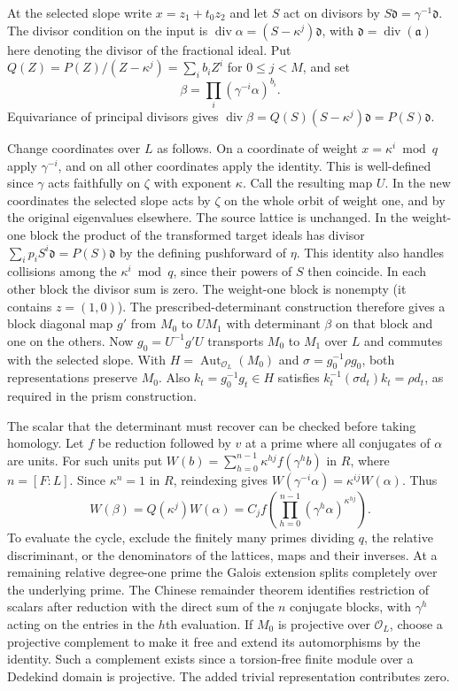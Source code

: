 \documentclass[11pt]{amsart}
\theoremstyle{definition}
\theoremstyle{remark}
\begin{document}
At the selected slope write $x=z_1+t_0z_2$ and let $S$ act on
divisors by $S\mathfrak d=\gamma^{-1}\mathfrak d$. The divisor
condition on the input is
$\operatorname{div}\alpha=(S-\kappa^j)\mathfrak d$, with
$\mathfrak d=\operatorname{div}(\mathfrak a)$ here denoting the
divisor of the fractional ideal. Put
$Q(Z)=P(Z)/(Z-\kappa^j)=\sum_i b_i Z^i$ for $0\le j<M$, and set
\[
 \beta=\prod_i(\gamma^{-i}\alpha)^{b_i}.
\]
Equivariance of principal divisors gives
$\operatorname{div}\beta=Q(S)(S-\kappa^j)\mathfrak d
=P(S)\mathfrak d$.

Change coordinates over $L$ as follows. On a coordinate of weight
$x=\kappa^i\bmod q$ apply $\gamma^{-i}$, and on all other coordinates
apply the identity. This is well-defined since $\gamma$ acts faithfully
on $\zeta$ with exponent $\kappa$. Call the resulting map $U$.
In the new coordinates the selected slope acts by $\zeta$ on the whole
orbit of weight one, and by the original eigenvalues elsewhere.
The source lattice is unchanged. In the weight-one block the product
of the transformed target ideals has divisor
$\sum_i p_i S^i\mathfrak d=P(S)\mathfrak d$ by the defining pushforward
of $\eta$. This identity also handles collisions among the
$\kappa^i\bmod q$, since their powers of $S$ then coincide. In each
other block the divisor sum is zero. The weight-one block is nonempty
(it contains $z=(1,0)$). The prescribed-determinant construction
therefore gives a block diagonal map $g'$ from $M_0$ to $UM_1$
with determinant $\beta$ on that block and one on the others.
Now $g_0=U^{-1}g'U$ transports $M_0$ to $M_1$ over $L$ and commutes
with the selected slope. With $H=\operatorname{Aut}_{\mathcal O_L}(M_0)$
and $\sigma=g_0^{-1}\rho g_0$, both representations preserve $M_0$.
Also $k_t=g_0^{-1}g_t\in H$ satisfies
$k_t^{-1}(\sigma d_t)k_t=\rho d_t$, as required in the prism construction.

The scalar that the determinant must recover can be checked before
taking homology. Let $f$ be reduction followed by $v$ at a prime
where all conjugates of $\alpha$ are units. For such units put
$W(b)=\sum_{h=0}^{n-1}\kappa^{hj} f(\gamma^h b)$ in $R$, where
$n=[F:L]$. Since $\kappa^n=1$ in $R$, reindexing gives
$W(\gamma^{-i}\alpha)=\kappa^{ij}W(\alpha)$. Thus
\[
 W(\beta)=Q(\kappa^j)W(\alpha)
 =C_j f\left(\prod_{h=0}^{n-1}
                (\gamma^h\alpha)^{\kappa^{hj}}\right).
\]
To evaluate the cycle, exclude the finitely many primes dividing
$q$, the relative discriminant, or the denominators of the lattices,
maps and their inverses. At a remaining relative degree-one prime
the Galois extension splits completely over the underlying prime.
The Chinese remainder theorem identifies restriction of scalars
after reduction with the direct sum of the $n$ conjugate blocks,
with $\gamma^h$ acting on the entries in the $h$th evaluation.
If $M_0$ is projective over $\mathcal O_L$, choose a projective
complement to make it free and extend its automorphisms by the
identity. Such a complement exists since a torsion-free finite
module over a Dedekind domain is projective. The added trivial
representation contributes zero.
\end{document}
